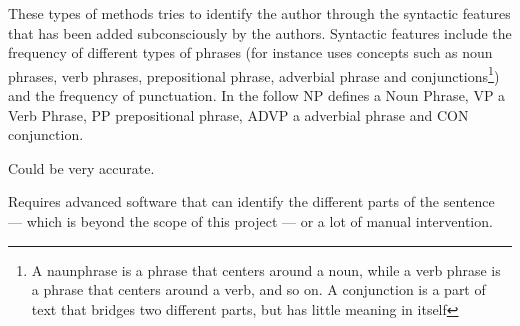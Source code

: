 {\label{syntactic}
These types of methods tries to identify the author through the syntactic features that has been added subconsciously by the authors. Syntactic features include the frequency of different types of phrases (for instance \cite{style} uses concepts such as noun phrases, verb phrases, prepositional phrase, adverbial phrase and conjunctions\footnote{A naunphrase is a phrase that centers around a noun, while a verb phrase is a phrase that centers around a verb, and so on. A conjunction is a part of text that bridges two different parts, but has little meaning in itself}) and the frequency of punctuation.
} 
{
In the follow NP defines a Noun Phrase, VP a Verb Phrase, PP prepositional phrase, ADVP a adverbial phrase and CON conjunction.\\
}
{
\item Could be very accurate.
}{
\item Requires advanced software that can identify the different parts of the sentence --- which is beyond the scope of this project --- or a lot of manual intervention.
}

